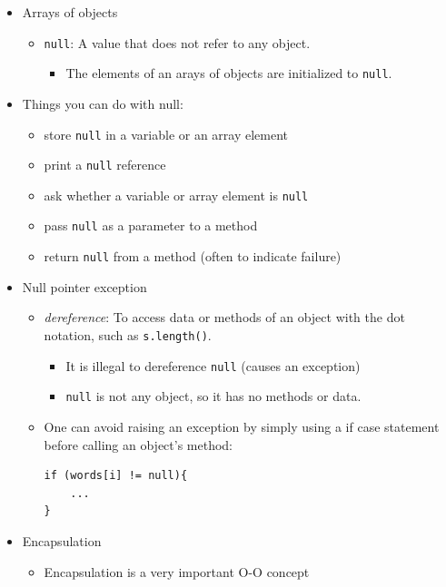 \documentclass[a4paper]{article}
\newcommand{\inline}[1]{\lstinline!#1!}%
\begin{document}
\begin{itemize}
\begin{itemize}
\begin{itemize}
				\end{itemize}
		\end{itemize}
	\item Arrays of objects
		\begin{itemize}
			\item \inline{null}: A value that does not refer to any object.
				\begin{itemize}
					\item The elements of an arays of objects are initialized to \inline{null}.\\
				\end{itemize}
		\end{itemize}
		\item Things you can do with null:
			\begin{itemize}
				\item store \inline{null} in a variable or an array element
				\item print a \inline{null} reference
				\item ask whether a variable or array element is \inline{null}
				\item pass \inline{null} as a parameter to a method
				\item return \inline{null} from a method (often to indicate failure)
			\end{itemize}
			\item Null pointer exception
				\begin{itemize}
					\item \textit{dereference}: To access data or methods of an object with the dot notation, such as \inline{s.length()}.
						\begin{itemize}
							\item It is illegal to dereference \inline{null} (causes an exception)
							\item \inline{null} is not any object, so it has no methods or data.
						\end{itemize}
					\item One can avoid raising an exception by simply using a if case statement before calling an object's method:
						\begin{lstlisting}
if (words[i] != null){
	...
}
					\end{lstlisting}
				\end{itemize}
	\item Encapsulation
		\begin{itemize}
			\item Encapsulation is a very important O-O concept

\end{itemize}
\end{itemize}
\end{document}
